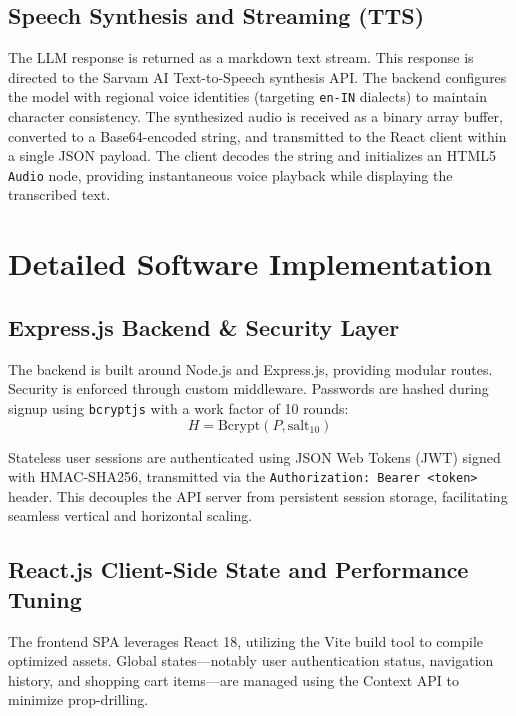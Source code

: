 \documentclass[conference]{IEEEtran}
\begin{document}
\subsection{Speech Synthesis and Streaming (TTS)}
The LLM response is returned as a markdown text stream. This response is directed to the Sarvam AI Text-to-Speech synthesis API. The backend configures the model with regional voice identities (targeting \texttt{en-IN} dialects) to maintain character consistency. The synthesized audio is received as a binary array buffer, converted to a Base64-encoded string, and transmitted to the React client within a single JSON payload. The client decodes the string and initializes an HTML5 \texttt{Audio} node, providing instantaneous voice playback while displaying the transcribed text.

\section{Detailed Software Implementation}

\subsection{Express.js Backend & Security Layer}
The backend is built around Node.js and Express.js, providing modular routes. Security is enforced through custom middleware. Passwords are hashed during signup using \texttt{bcryptjs} with a work factor of 10 rounds:
\begin{equation}
H = \text{Bcrypt}(P, \text{salt}_{10})
\end{equation}

Stateless user sessions are authenticated using JSON Web Tokens (JWT) signed with HMAC-SHA256, transmitted via the \texttt{Authorization: Bearer <token>} header. This decouples the API server from persistent session storage, facilitating seamless vertical and horizontal scaling.

\subsection{React.js Client-Side State and Performance Tuning}
The frontend SPA leverages React 18, utilizing the Vite build tool to compile optimized assets. Global states---notably user authentication status, navigation history, and shopping cart items---are managed using the Context API to minimize prop-drilling.
\end{document}
